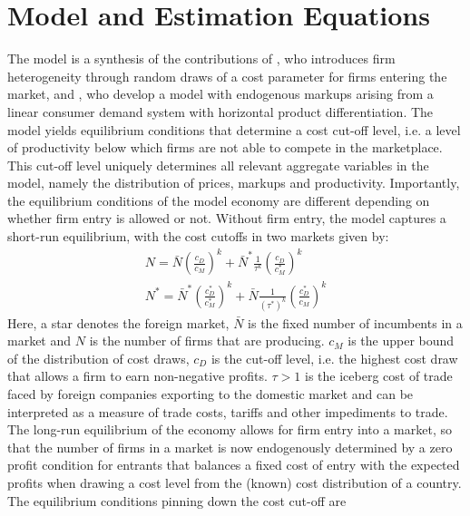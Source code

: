 
\section{Model and Estimation Equations}\label{sec:mo}

The \citet{MelitzOttaviano2008} model is a synthesis of the contributions of \citet{Melitz2003}, who introduces firm heterogeneity through random draws of a cost parameter for firms entering the market, and \citet{Ottaviano2002}, who develop a model with endogenous markups arising from a linear consumer demand system with horizontal product differentiation. The model yields equilibrium conditions that determine a cost cut-off level, i.e. a level of productivity below which firms are not able to compete in the marketplace. This cut-off level uniquely determines all relevant aggregate variables in the model, namely the distribution of prices, markups and productivity. Importantly, the equilibrium conditions of the model economy are different depending on whether firm entry is allowed or not. Without firm entry, the model captures a short-run equilibrium, with the cost cutoffs in two markets given by:
\begin{align}
N = \bar{N} \left( \frac{c_D}{c_M} \right)^k + \bar{N}^* \frac{1}{\tau^k}\left( \frac{c_D}{c_M^*} \right)^k \label{eq:m-o-supply-n} \\
N^* = \bar{N}^* \left( \frac{c_D^*}{c_M^*} \right)^k + \bar{N} \frac{1}{\left( \tau^* \right)^k}\left( \frac{c_D^*}{c_M} \right)^k \label{eq:m-o-supply-n*}
\end{align}
Here, a star denotes the foreign market, $\bar{N}$ is the fixed number of incumbents in a market and $N$ is the number of firms that are producing. $c_M$ is the upper bound of the distribution of cost draws, $c_D$ is the cut-off level, i.e. the highest cost draw that allows a firm to earn non-negative profits. $\tau>1$ is the iceberg cost of trade faced by foreign companies exporting to the domestic market and can be interpreted as a measure of trade costs, tariffs and other impediments to trade. \\
The long-run equilibrium of the economy allows for firm entry into a market, so that the number of firms in a market is now endogenously determined by a zero profit condition for entrants that balances a fixed cost of entry with the expected profits when drawing a cost level from the (known) cost distribution of a country. The equilibrium conditions pinning down the cost cut-off are
